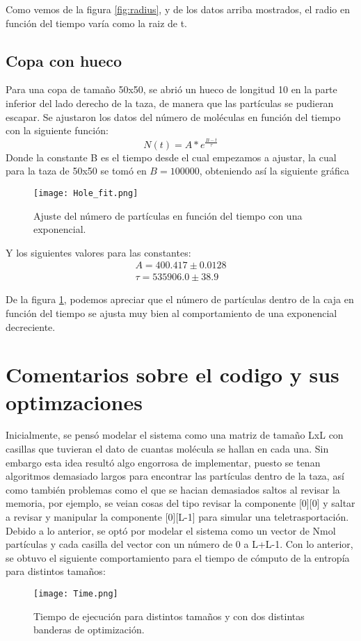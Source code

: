 \documentclass{article}
\begin{document}
  Como vemos de la figura \ref{fig:radius}, y de los datos arriba mostrados, el radio en función del tiempo varía como la raiz de t.
  
\subsection{Copa con hueco}
Para una copa de tamaño 50x50, se abrió un hueco de longitud 10 en la parte inferior del lado derecho de la taza, de manera que las partículas se pudieran escapar. Se ajustaron los datos del número de moléculas en función del tiempo con la siguiente función:
\begin{equation}
    N(t)= A*e^{\frac{B-t}{\tau}}
\end{equation}
Donde la constante B es el tiempo desde el cual empezamos a ajustar, la cual para la taza de 50x50 se tomó en $B=100000$, obteniendo así la siguiente gráfica
\begin{figure}[H]
   \centering
   \texttt{[image: Hole\_fit.png]}
   \caption{Ajuste del número de partículas en función del tiempo con una exponencial.}
   \label{fig:hole}
 \end{figure}
Y los siguientes valores para las constantes:
\begin{align}
    A= 400.417 \pm 0.0128 \\
    \tau = 535906.0 \pm 38.9
\end{align}

De la figura \ref{fig:hole}, podemos apreciar que el número de partículas dentro de la caja en función del tiempo se ajusta muy bien al comportamiento de una exponencial decreciente.


\section{Comentarios sobre el codigo y sus optimzaciones}

Inicialmente, se pensó modelar el sistema como una matriz de tamaño LxL con casillas que tuvieran el dato de cuantas molécula se hallan en cada una. Sin embargo esta idea resultó algo engorrosa de implementar, puesto se tenan algoritmos demasiado largos para encontrar las partículas dentro de la taza, así como también problemas como el que se hacian demasiados saltos al revisar la memoria, por ejemplo, se veian cosas del tipo revisar la componente [0][0] y saltar a revisar y manipular la componente [0][L-1] para simular una teletrasportación. Debido a lo anterior, se optó por modelar el sistema como un vector de Nmol partículas y cada casilla del vector con un número de 0 a L+L-1. Con lo anterior, se obtuvo el siguiente comportamiento para el tiempo de cómputo de la entropía para distintos tamaños:
\begin{figure}[H]
   \centering
   \texttt{[image: Time.png]}
   \caption{Tiempo de ejecución para distintos tamaños y con dos distintas banderas de optimización.}
   \label{fig:performance}
 \end{figure}
\end{document}

